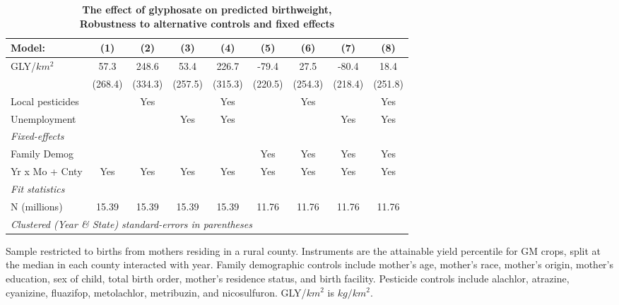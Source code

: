 \begin{table}[htbp]
   \centering
   \small
   \begin{threeparttable}[b]
      \caption{\label{tab:robust-cntrl-dbwt_pred-allyielddiffgmo500} \textbf{The effect of glyphosate on predicted birthweight, \\ Robustness to alternative controls and fixed effects}}
      \begin{tabular}{lcccccccc}
         \toprule
         Model:           & (1)     & (2)     & (3)     & (4)     & (5)     & (6)     & (7)     & (8)\\  
         \midrule 
         GLY/$km^2$       & 57.3    & 248.6   & 53.4    & 226.7   & -79.4   & 27.5    & -80.4   & 18.4\\   
                          & (268.4) & (334.3) & (257.5) & (315.3) & (220.5) & (254.3) & (218.4) & (251.8)\\   
         Local pesticides &         & Yes     &         & Yes     &         & Yes     &         & Yes\\  
         Unemployment     &         &         & Yes     & Yes     &         &         & Yes     & Yes\\  
         \midrule
         \emph{Fixed-effects}\\
         Family Demog     &         &         &         &         & Yes     & Yes     & Yes     & Yes\\  
         Yr x Mo + Cnty   & Yes     & Yes     & Yes     & Yes     & Yes     & Yes     & Yes     & Yes\\  
         \midrule
         \emph{Fit statistics}\\
         N (millions)     & 15.39   & 15.39   & 15.39   & 15.39   & 11.76   & 11.76   & 11.76   & 11.76\\  
         \midrule
         \multicolumn{9}{l}{\emph{Clustered (Year \& State) standard-errors in parentheses}}\\
      \end{tabular}
      
      \begin{tablenotes}\item Sample restricted to births from mothers residing in a rural county. Instruments are the attainable yield percentile for GM crops, split at the median in each county interacted with year. Family demographic controls include mother's age, mother's race, mother's origin, mother's education, sex of child, total birth order, mother's residence status, and birth facility. Pesticide controls include alachlor, atrazine, cyanizine, fluazifop, metolachlor, metribuzin, and nicosulfuron. GLY/$km^2$ is $kg/km^2$.
      \end{tablenotes}
   \end{threeparttable}
\end{table}
